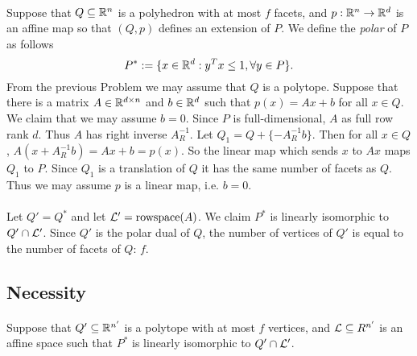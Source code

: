 \documentclass[letterpaper,12pt,oneside,onecolumn]{article}
\begin{document}
\paragraph{}
Suppose that $Q\subseteq \mathbb{R}^n$ is a polyhedron with at most $f$ facets, and $p:\mathbb{R}^n \rightarrow \mathbb{R}^d$ is an affine map so that $(Q,p)$ defines an extension of $P$. We define the \emph{polar} of $P$ as follows
$$P^* := \{x \in \mathbb{R}^d : y^Tx \leq 1, \forall y \in P\}.$$
From the previous Problem we may assume that $Q$ is a polytope. Suppose that there is a matrix $A \in \mathbb{R}^{d\times n}$ and $b \in \mathbb{R}^d$ such that $p(x) = Ax + b$ for all $x \in Q$. We claim that we may assume $b = 0$. Since $P$ is full-dimensional, $A$ as full row rank $d$. Thus $A$ has right inverse $A^{-1}_R$. Let $Q_1 = Q + \{-A^{-1}_Rb\}$. Then for all $x \in Q$,
$A(x + A^{-1}_Rb) = Ax  + b  = p(x).$ So the linear map which sends $x$ to $Ax$ maps $Q_1$ to $P$. Since $Q_1$ is a translation of $Q$ it has the same number of facets as $Q$. Thus we may assume $p$ is a linear map, i.e. $b=0$.
\paragraph{}
Let $Q' = Q^*$ and let $\mathcal{L}' = \text{rowspace}(A)$. We claim $P^*$ is linearly isomorphic to $Q' \cap \mathcal{L}'$. Since $Q'$ is the polar dual of $Q$, the number of vertices of $Q'$ is equal to the number of facets of $Q$: $f$.
\subsection*{Necessity}
\paragraph{}
Suppose that $Q'\subseteq \mathbb{R}^{n'}$ is a polytope with at most $f$ vertices, and $\mathcal{L} \subseteq R^{n'}$ is an affine space such that $P^*$ is linearly isomorphic to $Q' \cap \mathcal{L}'$.

\section{}
\paragraph{}

\section{}
\paragraph{}
\end{document}
